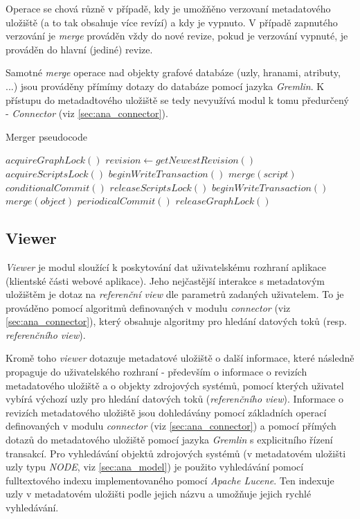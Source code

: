 Operace se chová různě v případě, kdy je umožňěno verzovaní metadatového uložiště (a to tak obsahuje více revízí) a kdy je vypnuto. V případě zapnutého verzování je \textit{merge} prováděn vždy do nové revize, pokud je verzování vypnuté, je prováděn do hlavní (jediné) revize.

Samotné \textit{merge} operace nad objekty grafové databáze (uzly, hranami, atributy, ...) jsou prováděny přímímy dotazy do databáze pomocí jazyka \textit{Gremlin}. K přístupu do metadadtového uložiště se tedy nevyužívá modul k tomu předurčený - \textit{Connector} (viz \ref{sec:ana_connector}).

\begin{algorithm}
\caption{Merger pseudocode}
\label{alg_merger}
\begin{algorithmic}
	\State $acquireGraphLock()$
	\State $revision\gets getNewestRevision()$
		\State $acquireScriptsLock()$
			\State $beginWriteTransaction()$
			\State $merge(script)$
			\State $conditionalCommit()$
		\EndFor
		\State $releaseScriptsLock()$
		\State $beginWriteTransaction()$
			\State $merge(object)$
			\State $periodicalCommit()$
		\EndFor
	\EndIf
	\State $releaseGraphLock()$
\end{algorithmic}
\end{algorithm}

\subsection{Viewer}
\label{sec:ana_viewer}
\textit{Viewer} je modul sloužící k poskytování dat uživatelskému rozhraní aplikace (klientské části webové aplikace). Jeho nejčastější interakce s metadatovým uložištěm je dotaz na \textit{referenční view} dle parametrů zadaných uživatelem. To je prováděno pomocí algoritmů definovaných v modulu \textit{connector} (viz \ref{sec:ana_connector}), který obsahuje algoritmy pro hledání datových toků (resp. \textit{referenčního view}).

Kromě toho \textit{viewer} dotazuje metadatové uložiště o další informace, které následně propaguje do uživatelského rozhraní - především o informace o revizích metadatového uložiště a o objekty zdrojových systémů, pomocí kterých uživatel vybírá výchozí uzly pro hledání datových toků (\textit{referenčního view}). Informace o revizích metadatového uložiště jsou dohledávány pomocí základních operací definovaných v modulu \textit{connector} (viz \ref{sec:ana_connector}) a pomocí přímých dotazů do metadatového uložiště pomocí jazyka \textit{Gremlin} s explicitního řízení transakcí. Pro vyhledávání objektů zdrojových systémů (v metadatovém uložišti uzly typu \textit{NODE}, viz \ref{sec:ana_model}) je použito vyhledávání pomocí fulltextového indexu implementovaného pomocí \textit{Apache Lucene}. Ten indexuje uzly v metadatovém uložišti podle jejich názvu a umožňuje jejich rychlé vyhledávání.


